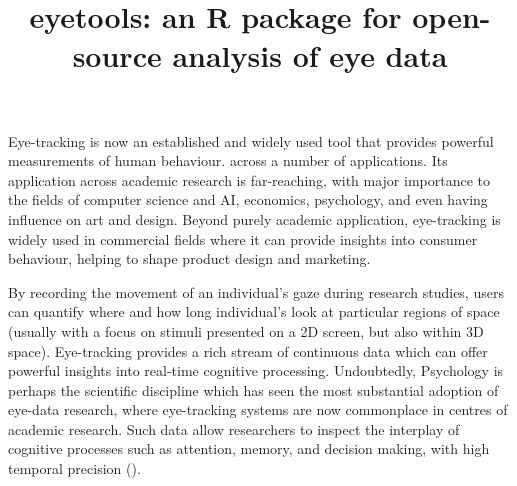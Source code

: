 \documentclass[
  man,
  floatsintext,
  longtable,
  nolmodern,
  notxfonts,
  notimes,
  colorlinks=true,linkcolor=blue,citecolor=blue,urlcolor=blue]{apa7}
\title{eyetools: an R package for open-source analysis of eye data}
\affiliation{
{Lancaster University}}
\begin{document}
\maketitle


\setcounter{secnumdepth}{-\maxdimen} %

\setlength\LTleft{0pt}

\resetlinenumber[1]

Eye-tracking is now an established and widely used tool that provides
powerful measurements of human behaviour. across a number of
applications. Its application across academic research is far-reaching,
with major importance to the fields of computer science and AI,
economics, psychology, and even having influence on art and design.
Beyond purely academic application, eye-tracking is widely used in
commercial fields where it can provide insights into consumer behaviour,
helping to shape product design and marketing.

By recording the movement of an individual's gaze during research
studies, users can quantify where and how long individual's look at
particular regions of space (usually with a focus on stimuli presented
on a 2D screen, but also within 3D space). Eye-tracking provides a rich
stream of continuous data which can offer powerful insights into
real-time cognitive processing. Undoubtedly, Psychology is perhaps the
scientific discipline which has seen the most substantial adoption of
eye-data research, where eye-tracking systems are now commonplace in
centres of academic research. Such data allow researchers to inspect the
interplay of cognitive processes such as attention, memory, and decision
making, with high temporal precision ().
\end{document}
